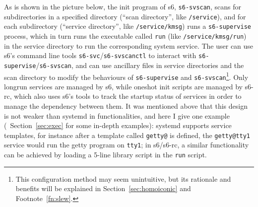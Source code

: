 As is shown in the picture below, the init program of s6, \verb|s6-svscan|,
scans for subdirectories in a specified directory (``scan directory'', like
\verb|/service|), and for each subdirectory (``service directory'', like
\verb|/service/kmsg|) runs a \verb|s6-supervise| process, which in turn
runs the executable called \verb|run| (like \verb|/service/kmsg/run|) in the
service directory to run the corresponding system service.  The user can
use s6's command line tools \verb|s6-svc|/\verb|s6-svscanctl| to interact
with \verb|s6-supervise|/\verb|s6-svscan|, and can use ancillary files in
service directories and the scan directory to modify the behaviours of
\verb|s6-supervise| and \verb|s6-svscan|\footnote{This configuration method
may seem unintuitive, but its rationale and benefits will be explained in
Section~\ref{sec:homoiconic} and Footnote~\ref{fn:slew}.}.  Only longrun
services are managed by s6, while oneshot init scripts are managed by s6-rc,
which also uses s6's tools to track the startup status of services in order
to manage the dependency between them.  It was mentioned above that this
design is not weaker than systemd in functionalities, and here I give one
example (\cf~Section~\ref{sec:exec} for some in-depth examples): systemd
supports service templates, for instance after a template called \verb|getty@|
is defined, the \verb|getty@tty1| service would run the getty program on
\verb|tty1|; in s6/s6-rc, a similar functionality can be achieved by loading
a 5-line library script in the \verb|run| script.
\begin{wquoting}
\end{wquoting}

